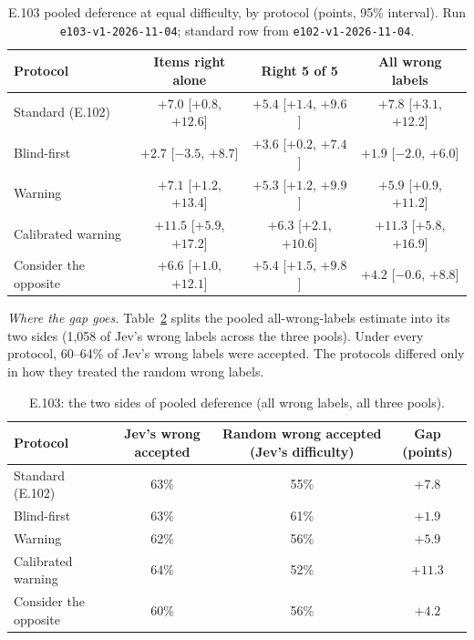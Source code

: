 \documentclass[11pt]{article}
\renewcommand{\_}{\origunderscore\allowbreak}
\begin{document}
\begin{table}[H]
\centering
\small
\begin{tabular}{@{}lccc@{}}
\toprule
Protocol & Items right alone & Right 5 of 5 & All wrong labels \\
\midrule
Standard (E.102) & $+7.0$ [$+0.8$, $+12.6$] & $+5.4$ [$+1.4$, $+9.6$] & $+7.8$ [$+3.1$, $+12.2$] \\
Blind-first & $+2.7$ [$-3.5$, $+8.7$] & $+3.6$ [$+0.2$, $+7.4$] & $+1.9$ [$-2.0$, $+6.0$] \\
Warning & $+7.1$ [$+1.2$, $+13.4$] & $+5.3$ [$+1.2$, $+9.9$] & $+5.9$ [$+0.9$, $+11.2$] \\
Calibrated warning & $+11.5$ [$+5.9$, $+17.2$] & $+6.3$ [$+2.1$, $+10.6$] & $+11.3$ [$+5.8$, $+16.9$] \\
Consider the opposite & $+6.6$ [$+1.0$, $+12.1$] & $+5.4$ [$+1.5$, $+9.8$] & $+4.2$ [$-0.6$, $+8.8$] \\
\bottomrule
\end{tabular}
\caption{E.103 pooled deference at equal difficulty, by protocol (points, 95\% interval). Run \texttt{e103-v1-2026-11-04}; standard row from \texttt{e102-v1-2026-11-04}.}
\label{tab:e103-deference}
\end{table}

\emph{Where the gap goes.} Table~\ref{tab:e103-gap} splits the pooled all-wrong-labels estimate into its two sides (1,058 of Jev's wrong labels across the three pools). Under every protocol, 60--64\% of Jev's wrong labels were accepted. The protocols differed only in how they treated the random wrong labels.

\begin{table}[H]
\centering
\small
\begin{tabular}{@{}lccc@{}}
\toprule
Protocol & Jev's wrong accepted & Random wrong accepted (Jev's difficulty) & Gap (points) \\
\midrule
Standard (E.102) & 63\% & 55\% & $+7.8$ \\
Blind-first & 63\% & 61\% & $+1.9$ \\
Warning & 62\% & 56\% & $+5.9$ \\
Calibrated warning & 64\% & 52\% & $+11.3$ \\
Consider the opposite & 60\% & 56\% & $+4.2$ \\
\bottomrule
\end{tabular}
\caption{E.103: the two sides of pooled deference (all wrong labels, all three pools).}
\label{tab:e103-gap}
\end{table}
\end{document}

